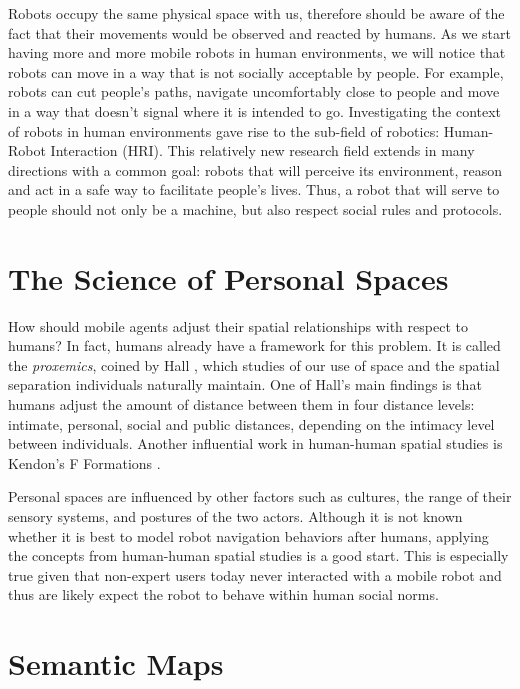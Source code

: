 Robots occupy the same physical space with us, therefore should be aware of the fact that their movements would be observed and reacted by humans. As we start having more and more mobile robots in human environments, we will notice that robots can move in a way that is not socially acceptable by people. For example, robots can cut people's paths, navigate uncomfortably close to people and move in a way that doesn't signal where it is intended to go. Investigating the context of robots in human environments gave rise to the sub-field of robotics: Human-Robot Interaction (HRI). This relatively new research field extends in many directions with a common goal: robots that will perceive its environment, reason and act in a safe way to facilitate people's lives. Thus, a robot that will serve to people should not only be a machine, but also respect social rules and protocols.

\section{The Science of Personal Spaces}
\label{sec:personal_spaces}

How should mobile agents adjust their spatial relationships with respect to humans? In fact, humans already have a framework for this problem. It is called the \textit{proxemics}, coined by Hall \cite{hall1966hidden}, which studies of our use of space and the spatial separation individuals naturally maintain. One of Hall's main findings is that humans adjust the amount of distance between them in four distance levels: intimate, personal, social and public distances, depending on the intimacy level between individuals. Another influential work in human-human spatial studies is Kendon's F Formations .

Personal spaces are influenced by other factors such as cultures, the range of their sensory systems, and postures of the two actors. Although it is not known whether it is best to model robot navigation behaviors after humans, applying the concepts from human-human spatial studies is a good start. This is especially true given that non-expert users today never interacted with a mobile robot and thus are likely expect the robot to behave within human social norms.

\section{Semantic Maps}
\label{sec:semantic_maps}

